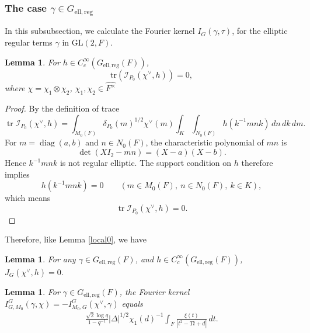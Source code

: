 \documentclass[11pt]{amsart}
\newtheorem {lemma}      [theorem]    {Lemma}
\renewcommand{\rm}{\mathrm}
\newcommand{\GGL}{\mathrm{GL}}
\theoremstyle{definition}
\numberwithin{equation}{section}
\begin{document}
    \subsubsection{The case \(\gamma\in G_{\rm{ell,reg}}\)}
    In this subsubsection, we calculate the Fourier kernel \(I_G(\gamma,\tau)\), for the elliptic regular terms \(\gamma \) in \(\GGL(2,F)\).
    \begin{lemma}
        For \(h\in C_c^\infty(G_{\rm{ell,reg}}(F))\),\[\rm{tr}(\mathscr{I}_{P_0}(\chi^\vee,h))=0,\]where \(\chi=\chi_1\otimes\chi_2\), \(\chi_1,\chi_2\in\widehat{F^\times}\)
    \end{lemma}
    \begin{proof}
By the definition of trace \[\operatorname{tr}\mathscr I_{P_0}(\chi^\vee,h)
=
\int_{M_0(F)}
\delta_{P_0}(m)^{1/2}\chi^\vee(m)
\int_K\int_{N_0(F)}
h(k^{-1}mnk)\,dn\,dk\,dm.
\]
For \(m=\operatorname{diag}(a,b)\) and \(n\in N_0(F)\), the characteristic polynomial of \(mn\) is
\[
\det(XI_2-mn)=(X-a)(X-b).
\]
Hence \(k^{-1}mnk\) is not regular elliptic. The support condition on
\(h\) therefore implies
\[
h(k^{-1}mnk)=0
\qquad
(m\in M_0(F),\ n\in N_0(F),\ k\in K),
\]
which means
\[
\operatorname{tr}\mathscr I_{P_0}(\chi^\vee,h)=0.
\]
\end{proof}
Therefore, like Lemma \ref{local0}, we have
\begin{lemma}\label{simil}
    For any \(\gamma\in G_{\rm{ell,reg}}(F)\), and \(h\in C_c^\infty(G_{\rm{ell,reg}}(F))\), \(J_{G}(\chi^\vee,h)=0\).
\end{lemma}
\begin{lemma}
    For \(\gamma\in G_{\rm{ell,reg}}(F)\), the Fourier kernel \(I_{G,M_0}^G(\gamma,\chi)=-I_{M_0,G}^G(\chi^\vee,\gamma)
\) equals 
    \begin{align*}
\frac{\sqrt2\log q}{1-q^{-1}}
|\Delta|^{1/2}\chi_1(d)^{-1}
\int_F\frac{\xi(t)}{|t^2-Tt+d|}\,dt.
    \end{align*}
\end{lemma}
\end{document}
